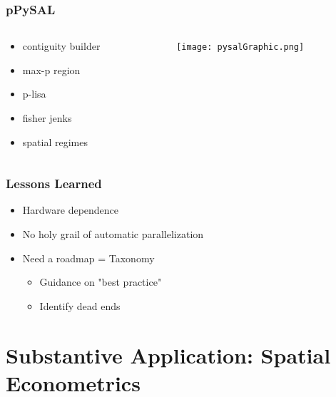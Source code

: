 \documentclass[usepdftitle=false,professionalfonts,compress ]{beamer}
\begin{document}
{
\begin{frame}\frametitle{pPySAL}
\begin{columns}
	\begin{column}{0.3\textwidth}
	\begin{itemize}

		\item contiguity builder
		\item max-p region
		\item p-lisa
		\item fisher jenks
		\item spatial regimes
	\end{itemize}
	\end{column}
	\begin{column}{0.8799999999999999\textwidth}

\begin{figure}
	\texttt{[image: pysalGraphic.png]}\end{figure}\end{column}
\end{columns}

\end{frame}
}











{
\begin{frame}\frametitle{Lessons Learned}
	\begin{itemize}

		\item Hardware dependence
		\item No holy grail of automatic parallelization
		\item Need a roadmap = Taxonomy
		\begin{itemize}

			\item Guidance on "best practice"
			\item Identify dead ends
		\end{itemize}
	\end{itemize}

\end{frame}
}








\section{Substantive Application: Spatial Econometrics}
		
\end{document}
